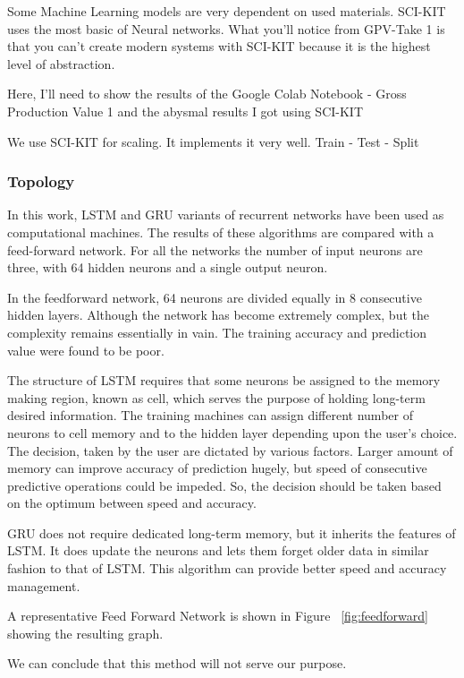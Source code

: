 Some Machine Learning models are very dependent on used materials. SCI-KIT uses the most basic of Neural networks. What you'll notice from GPV-Take 1 is that you can't create modern systems with SCI-KIT because it is the highest level of abstraction.

Here, I'll need to show the results of the Google Colab Notebook - Gross Production Value 1 and the abysmal results I got using SCI-KIT

We use SCI-KIT for scaling. It implements it very well. Train - Test - Split
\cite{ponce1989engineering}


\subsubsection{Topology}

In this work, LSTM and GRU variants of recurrent networks have been used as computational machines. The results of these algorithms are compared with a feed-forward network. For all the networks the number of input neurons are three, with 64 hidden neurons and a single output neuron.  

In the feedforward network, 64 neurons are divided equally in 8 consecutive hidden layers. Although the network has become extremely complex, but the complexity remains essentially in vain. The training accuracy and prediction value were found to be poor. 

The structure of LSTM requires that some neurons be assigned to the memory making region, known as cell, which serves the purpose of holding long-term desired information. The training machines can assign different number of neurons to cell memory and to the hidden layer depending upon the user's choice. The decision, taken by the user are dictated by various factors. Larger amount of memory can improve accuracy of prediction hugely, but speed of consecutive predictive operations could be impeded. So, the decision should be taken based on the optimum between speed and accuracy. 

GRU does not require dedicated long-term memory, but it inherits the features of LSTM. It does update the neurons and lets them forget older data in similar fashion to that of LSTM. This algorithm can provide better speed and accuracy management.  

A representative Feed Forward Network is shown in Figure ~\ref{fig:feedforward} showing the resulting graph.

We can conclude that this method will not serve our purpose. 


